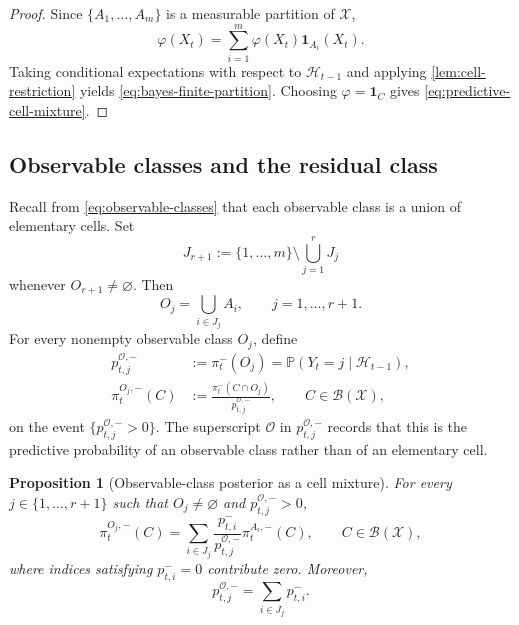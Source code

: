 \documentclass[10pt,twocolumn]{article}
\newtheorem{proposition}{Proposition}
\theoremstyle{remark}
\newcommand{\Pp}{\mathbb{P}}
\newcommand{\B}{\mathcal{B}}
\newcommand{\Hh}{\mathcal{H}}
\newcommand{\Oo}{\mathcal{O}}
\newcommand{\Xcal}{\mathcal{X}}
\newcommand{\one}{\mathbf{1}}
\begin{document}
\begin{proof}
	Since $\{A_1,\ldots,A_m\}$ is a measurable partition of $\Xcal$,
	\[
	\varphi(X_t)
	=
	\sum_{i=1}^{m}\varphi(X_t)\one_{A_i}(X_t).
	\]
	Taking conditional expectations with respect to $\Hh_{t-1}$ and applying \cref{lem:cell-restriction} yields \cref{eq:bayes-finite-partition}. Choosing $\varphi=\one_C$ gives \cref{eq:predictive-cell-mixture}.
\end{proof}

\subsection{Observable classes and the residual class}
\label{subsec:observable-residual-classes}

Recall from \cref{eq:observable-classes} that each observable class is a union of elementary cells. Set
\begin{equation*}
	J_{r+1}
	:=
	\{1,\ldots,m\}\setminus\bigcup_{j=1}^{r}J_j
	\label{eq:residual-index-set}
\end{equation*}
whenever $O_{r+1}\neq\varnothing$. Then
\[
O_j=\bigcup_{i\in J_j}A_i,
\qquad j=1,\ldots,r+1.
\]
For every nonempty observable class $O_j$, define
\begin{align}
	p_{t,j}^{\Oo,-}
	&:=\pi_t^{-}(O_j)
	=\Pp(Y_t=j\mid\Hh_{t-1}),
	\label{eq:observable-class-mass}
	\\
	\pi_t^{O_j,-}(C)
	&:=\frac{\pi_t^{-}(C\cap O_j)}{p_{t,j}^{\Oo,-}},
	\qquad C\in\B(\Xcal),
	\label{eq:observable-class-conditional-measure}
\end{align}
on the event $\{p_{t,j}^{\Oo,-}>0\}$. The superscript $\Oo$ in $p_{t,j}^{\Oo,-}$ records that this is the predictive probability of an observable class rather than of an elementary cell.

\begin{proposition}[Observable-class posterior as a cell mixture]
	\label{prop:class-as-cell-mixture}
	For every $j\in\{1,\ldots,r+1\}$ such that $O_j\neq\varnothing$ and $p_{t,j}^{\Oo,-}>0$,
	\begin{equation}
		\pi_t^{O_j,-}(C)
		=
		\sum_{i\in J_j}
		\frac{p_{t,i}^{-}}{p_{t,j}^{\Oo,-}}
		\pi_t^{A_i,-}(C),
		\qquad C\in\B(\Xcal),
		\label{eq:observable-class-cell-mixture}
	\end{equation}
	where indices satisfying $p_{t,i}^{-}=0$ contribute zero. Moreover,
	\begin{equation}
		p_{t,j}^{\Oo,-}
		=
		\sum_{i\in J_j}p_{t,i}^{-}.
		\label{eq:observable-class-cell-mass}
	\end{equation}
\end{proposition}
\end{document}
